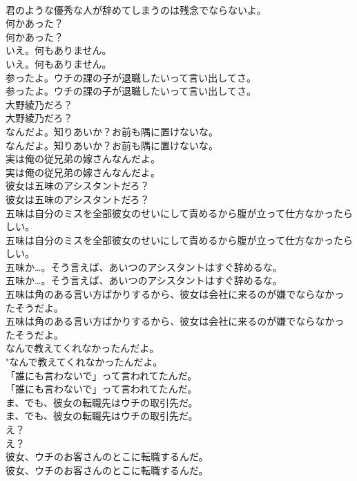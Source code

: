\documentclass[8pt]{extreport}
\begin{document}
\begin{CJK}{UTF8}{min}
\\	君のような優秀な人が辞めてしまうのは残念でならないよ。 
\\	何かあった？	
\\	何かあった？ 
\\	いえ。何もありません。	
\\	いえ。何もありません。 
\\	参ったよ。ウチの課の子が退職したいって言い出してさ。	
\\	参ったよ。ウチの課の子が退職したいって言い出してさ。 
\\	大野綾乃だろ？	
\\	大野綾乃だろ？ 
\\	なんだよ。知りあいか？お前も隅に置けないな。	
\\	なんだよ。知りあいか？お前も隅に置けないな。 
\\	実は俺の従兄弟の嫁さんなんだよ。	
\\	実は俺の従兄弟の嫁さんなんだよ。 
\\	彼女は五味のアシスタントだろ？	
\\	彼女は五味のアシスタントだろ？ 
\\	五味は自分のミスを全部彼女のせいにして責めるから腹が立って仕方なかったらしい。	
\\	五味は自分のミスを全部彼女のせいにして責めるから腹が立って仕方なかったらしい。 
\\	五味か…。そう言えば、あいつのアシスタントはすぐ辞めるな。	
\\	五味か…。そう言えば、あいつのアシスタントはすぐ辞めるな。 
\\	五味は角のある言い方ばかりするから、彼女は会社に来るのが嫌でならなかったそうだよ。	
\\	五味は角のある言い方ばかりするから、彼女は会社に来るのが嫌でならなかったそうだよ。 
\\	なんで教えてくれなかったんだよ。	
\\	"なんで教えてくれなかったんだよ。 
\\	「誰にも言わないで」って言われてたんだ。	
\\	「誰にも言わないで」って言われてたんだ。 
\\	ま、でも、彼女の転職先はウチの取引先だ。	
\\	ま、でも、彼女の転職先はウチの取引先だ。 
\\	え？	
\\	え？ 
\\	彼女、ウチのお客さんのとこに転職するんだ。	
\\	彼女、ウチのお客さんのとこに転職するんだ。 

\end{CJK}
\end{document}
